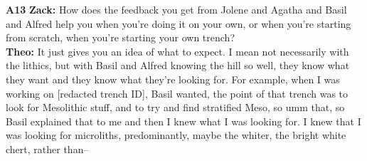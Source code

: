 \documentclass{article}
\begin{document}
\noindent\textbf{A13}\label{sec-A13}\newline
\textbf{Zack:} How does the feedback you get from Jolene and Agatha and
Basil and Alfred help you when you're doing it on your own, or when
you're starting from scratch, when you're starting your own trench?\\
\textbf{Theo:} It just gives you an idea of what to expect. I mean not
necessarily with the lithics, but with Basil and Alfred knowing the hill
so well, they know what they want and they know what they're looking
for. For example, when I was working on {[}redacted trench ID{]}, Basil
wanted, the point of that trench was to look for Mesolithic stuff, and
to try and find stratified Meso, so umm that, so Basil explained that to
me and then I knew what I was looking for. I knew that I was looking for
microliths, predominantly, maybe the whiter, the bright white chert,
rather than--\newline
\end{document}
